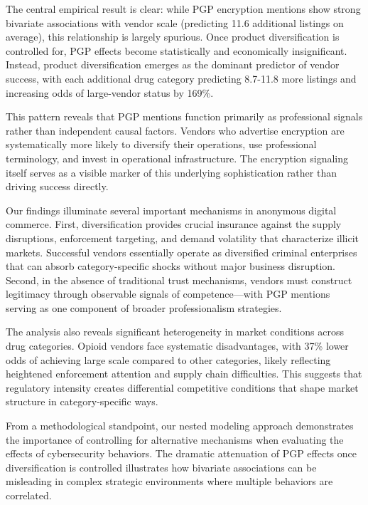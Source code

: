 \documentclass{article}
\begin{document}
The central empirical result is clear: while PGP encryption mentions show strong bivariate associations with vendor scale (predicting 11.6 additional listings on average), this relationship is largely spurious. Once product diversification is controlled for, PGP effects become statistically and economically insignificant. Instead, product diversification emerges as the dominant predictor of vendor success, with each additional drug category predicting 8.7-11.8 more listings and increasing odds of large-vendor status by 169\%.

This pattern reveals that PGP mentions function primarily as professional signals rather than independent causal factors. Vendors who advertise encryption are systematically more likely to diversify their operations, use professional terminology, and invest in operational infrastructure. The encryption signaling itself serves as a visible marker of this underlying sophistication rather than driving success directly.

Our findings illuminate several important mechanisms in anonymous digital commerce. First, diversification provides crucial insurance against the supply disruptions, enforcement targeting, and demand volatility that characterize illicit markets. Successful vendors essentially operate as diversified criminal enterprises that can absorb category-specific shocks without major business disruption. Second, in the absence of traditional trust mechanisms, vendors must construct legitimacy through observable signals of competence—with PGP mentions serving as one component of broader professionalism strategies.

The analysis also reveals significant heterogeneity in market conditions across drug categories. Opioid vendors face systematic disadvantages, with 37\% lower odds of achieving large scale compared to other categories, likely reflecting heightened enforcement attention and supply chain difficulties. This suggests that regulatory intensity creates differential competitive conditions that shape market structure in category-specific ways.

From a methodological standpoint, our nested modeling approach demonstrates the importance of controlling for alternative mechanisms when evaluating the effects of cybersecurity behaviors. The dramatic attenuation of PGP effects once diversification is controlled illustrates how bivariate associations can be misleading in complex strategic environments where multiple behaviors are correlated.
\end{document}
